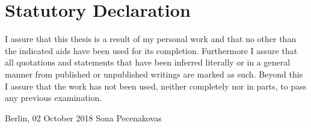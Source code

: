 \documentclass[12pt]{report}
\begin{document}
\appendix

\newpage
{}

\renewcommand{\refname}{Bibliography}

\clearpage

\pagestyle{plain}
\chapter*{Statutory Declaration}
I assure that this thesis is a result of my personal work and that no other than the indicated aids have been used for its completion. Furthermore I assure that all quotations and statements that have been inferred literally or in a general manner from published or unpublished writings are marked as such. Beyond this I assure that the work has not been used, neither completely nor in parts, to pass any previous examination.

\vspace{2cm}
\noindent
Berlin, 02 October 2018
\hfill
Sona Pecenakovas
\clearpage



\end{document}
